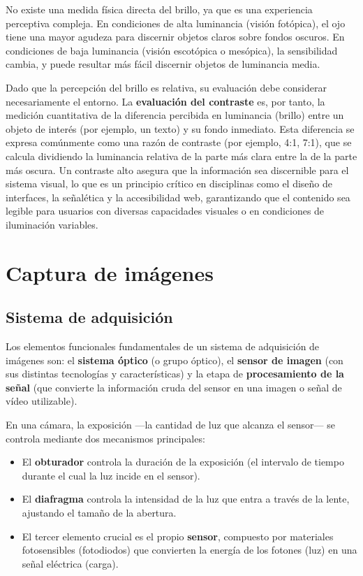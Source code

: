 No existe una medida física directa del brillo, ya que es una experiencia perceptiva compleja. En condiciones de alta luminancia (visión fotópica), el ojo tiene una mayor agudeza para discernir objetos claros sobre fondos oscuros. En condiciones de baja luminancia (visión escotópica o mesópica), la sensibilidad cambia, y puede resultar más fácil discernir objetos de luminancia media. 

Dado que la percepción del brillo es relativa, su evaluación debe considerar necesariamente el entorno. La \textbf{evaluación del contraste} es, por tanto, la medición cuantitativa de la diferencia percibida en luminancia (brillo) entre un objeto de interés (por ejemplo, un texto) y su fondo inmediato. Esta diferencia se expresa comúnmente como una razón de contraste (por ejemplo, 4:1, 7:1), que se calcula dividiendo la luminancia relativa de la parte más clara entre la de la parte más oscura. Un contraste alto asegura que la información sea discernible para el sistema visual, lo que es un principio crítico en disciplinas como el diseño de interfaces, la señalética y la accesibilidad web, garantizando que el contenido sea legible para usuarios con diversas capacidades visuales o en condiciones de iluminación variables.

\section{Captura de imágenes}
\subsection{Sistema de adquisición}
Los elementos funcionales fundamentales de un sistema de adquisición de imágenes son: el \textbf{sistema óptico} (o grupo óptico), el \textbf{sensor de imagen} (con sus distintas tecnologías y características) y la etapa de \textbf{procesamiento de la señal} (que convierte la información cruda del sensor en una imagen o señal de vídeo utilizable).

En una cámara, la exposición —la cantidad de luz que alcanza el sensor— se controla mediante dos mecanismos principales:
\begin{itemize}
\item El \textbf{obturador} controla la duración de la exposición (el intervalo de tiempo durante el cual la luz incide en el sensor).
\item El \textbf{diafragma} controla la intensidad de la luz que entra a través de la lente, ajustando el tamaño de la abertura.
\item El tercer elemento crucial es el propio \textbf{sensor}, compuesto por materiales fotosensibles (fotodiodos) que convierten la energía de los fotones (luz) en una señal eléctrica (carga).
\end{itemize}

